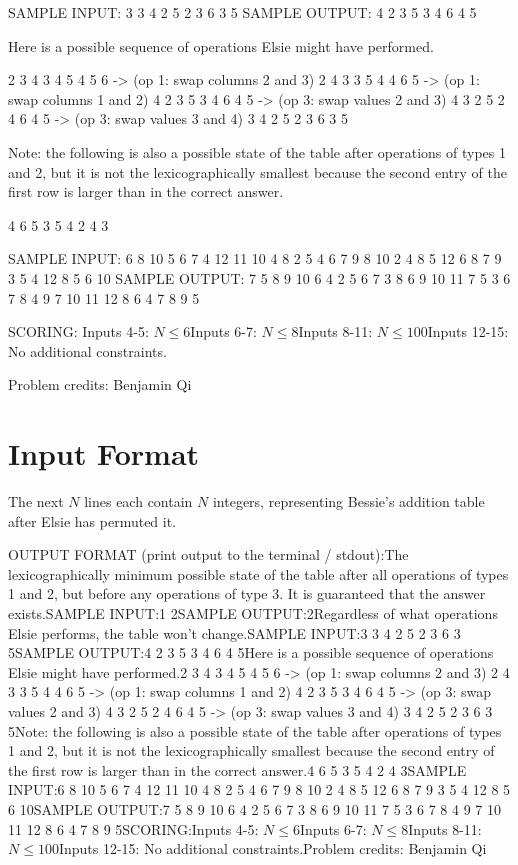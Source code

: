 \documentclass[12pt]{article}
\begin{document}
SAMPLE INPUT:
3
3 4 2
5 2 3
6 3 5
SAMPLE OUTPUT: 
4 2 3
5 3 4
6 4 5

Here is a possible sequence of operations Elsie might have performed.


2 3 4
3 4 5
4 5 6
-> (op 1: swap columns 2 and 3)
2 4 3
3 5 4
4 6 5
-> (op 1: swap columns 1 and 2)
4 2 3
5 3 4
6 4 5
-> (op 3: swap values 2 and 3)
4 3 2
5 2 4
6 4 5
-> (op 3: swap values 3 and 4)
3 4 2
5 2 3
6 3 5

Note: the following is also a possible state of the table after operations of
types 1 and 2, but it is not the lexicographically smallest because the second
entry of the first row is larger than in the correct answer.


4 6 5
3 5 4
2 4 3

SAMPLE INPUT:
6
8 10 5 6 7 4
12 11 10 4 8 2
5 4 6 7 9 8
10 2 4 8 5 12
6 8 7 9 3 5
4 12 8 5 6 10
SAMPLE OUTPUT: 
7 5 8 9 10 6
4 2 5 6 7 3
8 6 9 10 11 7
5 3 6 7 8 4
9 7 10 11 12 8
6 4 7 8 9 5

SCORING:
Inputs 4-5: $N\le 6$Inputs 6-7: $N\le 8$Inputs 8-11: $N\le 100$Inputs 12-15: No additional constraints.


Problem credits: Benjamin Qi



\section*{Input Format}
The next $N$ lines each contain $N$ integers, representing Bessie's addition
table after Elsie has permuted it.

OUTPUT FORMAT (print output to the terminal / stdout):The lexicographically minimum possible state of the table after all operations
of types 1 and 2, but before any operations of type 3. It is guaranteed that the
answer exists.SAMPLE INPUT:1
2SAMPLE OUTPUT:2Regardless of what operations Elsie performs, the table won't change.SAMPLE INPUT:3
3 4 2
5 2 3
6 3 5SAMPLE OUTPUT:4 2 3
5 3 4
6 4 5Here is a possible sequence of operations Elsie might have performed.2 3 4
3 4 5
4 5 6
-> (op 1: swap columns 2 and 3)
2 4 3
3 5 4
4 6 5
-> (op 1: swap columns 1 and 2)
4 2 3
5 3 4
6 4 5
-> (op 3: swap values 2 and 3)
4 3 2
5 2 4
6 4 5
-> (op 3: swap values 3 and 4)
3 4 2
5 2 3
6 3 5Note: the following is also a possible state of the table after operations of
types 1 and 2, but it is not the lexicographically smallest because the second
entry of the first row is larger than in the correct answer.4 6 5
3 5 4
2 4 3SAMPLE INPUT:6
8 10 5 6 7 4
12 11 10 4 8 2
5 4 6 7 9 8
10 2 4 8 5 12
6 8 7 9 3 5
4 12 8 5 6 10SAMPLE OUTPUT:7 5 8 9 10 6
4 2 5 6 7 3
8 6 9 10 11 7
5 3 6 7 8 4
9 7 10 11 12 8
6 4 7 8 9 5SCORING:Inputs 4-5: $N\le 6$Inputs 6-7: $N\le 8$Inputs 8-11: $N\le 100$Inputs 12-15: No additional constraints.Problem credits: Benjamin Qi
\end{document}
